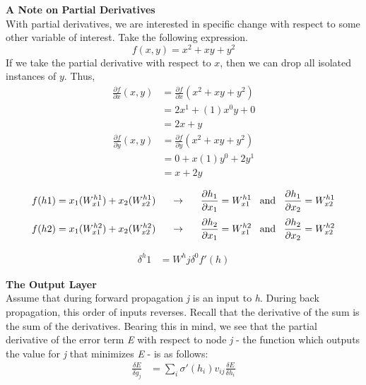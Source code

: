 \documentclass[]{article}
\begin{document}
\noindent\textbf{A Note on Partial Derivatives}\\
With partial derivatives, we are interested in specific change with respect to some other variable of interest. Take the following expression. 
\[f(x, y) = x^2 + xy + y^2\]
If we take the partial derivative with respect to $x$, then we can drop all isolated instances of $y$. Thus,
\newpage
\begin{equation} 
\begin{split}
\displaystyle\frac{\partial f}{\partial x}(x,y) & = \displaystyle\frac{\partial f}{\partial x}(x^2 + xy + y^2) \\
& = 2x^{1} + (1)x^0y + 0 \\
& = 2x + y
\end{split}
\end{equation}
\begin{equation} 
\begin{split}
\displaystyle\frac{\partial f}{\partial y}(x,y) & = \displaystyle\frac{\partial f}{\partial y}(x^2 + xy + y^2) \\
& = 0 + x(1)y^0 + 2y^1 \\
& = x + 2y
\end{split}
\end{equation}



\[f(h1) = x_1(W_{x1}^{h1}) + x_2(W_{x2}^{h1}) \text{\phantom{aaa}} \rightarrow \text{\phantom{aaa}} \displaystyle\frac{\partial h_1}{\partial x_1} = W_{x1}^{h1} \text{\phantom{a} and \phantom{a}} \displaystyle\frac{\partial h_1}{\partial x_2} = W_{x2}^{h1}\]
\[f(h2) = x_1(W_{x1}^{h2}) + x_2(W_{x2}^{h2}) \text{\phantom{aaa}} \rightarrow \text{\phantom{aaa}} \displaystyle\frac{\partial h_2}{\partial x_1} = W_{x1}^{h2} \text{\phantom{a} and \phantom{a}} \displaystyle\frac{\partial h_2}{\partial x_2} = W_{x2}^{h2}\]

\begin{equation} 
\begin{split}
\delta^h1 & = W^hj\delta^0f'(h) 
\end{split}
\end{equation}




\noindent\textbf{The Output Layer}\\
Assume that during forward propagation \textit{j} is an input to \textit{h}. During back propagation, this order of inputs reverses. Recall that the derivative of the sum is the sum of the derivatives. Bearing this in mind, we see that the partial derivative of the error term \textit{E} with respect to node \textit{j} - the function which outputs the value for \textit{j} that minimizes \textit{E} - is as follows:
\begin{equation} \label{eq1}
\begin{split}
\displaystyle\frac{\delta E}{\delta g_j} & = \sum_i\sigma'(h_i)v_{ij}\displaystyle\frac{\delta E}{\delta h_i}\\
\end{split}
\end{equation}
\end{document}
